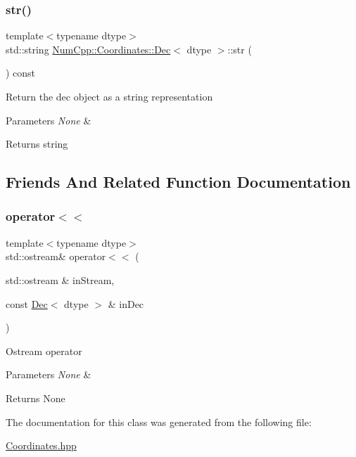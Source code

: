 \subsubsection{\texorpdfstring{str()}{str()}}
{\footnotesize\ttfamily template$<$typename dtype$>$ \\
std\+::string \mbox{\hyperlink{class_num_cpp_1_1_coordinates_1_1_dec}{Num\+Cpp\+::\+Coordinates\+::\+Dec}}$<$ dtype $>$\+::str (\begin{DoxyParamCaption}{ }\end{DoxyParamCaption}) const\hspace{0.3cm}{\ttfamily [inline]}}

Return the dec object as a string representation


\begin{DoxyParams}{Parameters}
{\em None} & \\
\hline
\end{DoxyParams}
\begin{DoxyReturn}{Returns}
string 
\end{DoxyReturn}


\subsection{Friends And Related Function Documentation}
\mbox{\label{class_num_cpp_1_1_coordinates_1_1_dec_aa501ef35ac052d5084d792bfcde2345f}} 
\subsubsection{\texorpdfstring{operator$<$$<$}{operator<<}}
{\footnotesize\ttfamily template$<$typename dtype$>$ \\
std\+::ostream\& operator$<$$<$ (\begin{DoxyParamCaption}\item[{std\+::ostream \&}]{in\+Stream,  }\item[{const \mbox{\hyperlink{class_num_cpp_1_1_coordinates_1_1_dec}{Dec}}$<$ dtype $>$ \&}]{in\+Dec }\end{DoxyParamCaption})\hspace{0.3cm}{\ttfamily [friend]}}

Ostream operator


\begin{DoxyParams}{Parameters}
{\em None} & \\
\hline
\end{DoxyParams}
\begin{DoxyReturn}{Returns}
None 
\end{DoxyReturn}


The documentation for this class was generated from the following file\+:\begin{DoxyCompactItemize}
\item 
\mbox{\hyperlink{_coordinates_8hpp}{Coordinates.\+hpp}}\end{DoxyCompactItemize}
